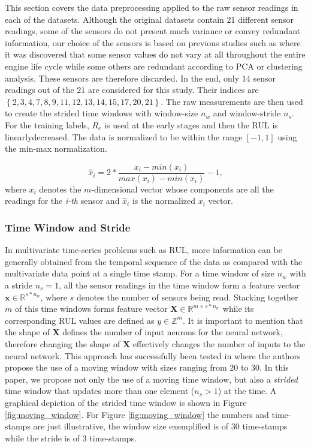 \documentclass[preprint,12pt]{elsarticle}%
\begin{document}
This section covers the data preprocessing applied to the raw sensor readings in each of the datasets. Although the original datasets contain $21$ different sensor readings, some of the sensors do not present much variance or convey redundant information, our choice of the sensors is based on previous studies such as \cite{Lim2016, Li2018} where it was discovered that some sensor values do not vary at all throughout the entire engine life cycle while some others are redundant according to PCA or clustering analysis. These sensors are therefore discarded. In the end, only $14$ sensor readings out of the $21$ are considered for this study. Their indices are $\left\lbrace 2, 3, 4, 7, 8, 9, 11, 12, 13, 14, 15, 17, 20, 21 \right\rbrace $. The raw measurements are then used to create the strided time windows with window-size $n_{w}$ and window-stride $n_{s}$. For the training labels, $R_{e}$ is used at the early stages and then the RUL is linearlydecreased. The data is normalized to be within the range $\left[  -1,1 \right]  $ using the min-max normalization.

\begin{equation}
\hat{x}_{i} = 2* \frac{x_{i} - min(x_{i})}{max(x_{i}) - min(x_{i})} - 1,
\label{eq:min_max_norm}%
\end{equation}
where $x_{i}$ denotes the $m$-dimensional vector whose components are all the
readings for the \textit{i-th} sensor and $\hat{x}_{i}$ is the normalized
$x_{i}$ vector.

\subsubsection{Time Window and Stride}

In multivariate time-series problems such as RUL, more information can be
generally obtained from the temporal sequence of the data as compared with the
multivariate data point at a single time stamp. For a time window of size
$n_{w}$ with a stride $n_{s}=1$, all the sensor readings in the time window
form a feature vector $\mathbf{x} \in \mathbb{R}^{s*n_w}$, where $s$ denotes the number of sensors being read. Stacking together $m$ of this time windows forms feature vector $\mathbf{X} \in \mathbb{R}^{m \times s*n_w}$ while its corresponding RUL values are defined as $y \in \mathbb{Z}^m$. It is important to mention that the shape of $\mathbf{X}$ defines the number of input neurons for the neural network, therefore changing the shape of $\mathbf{X}$ effectively changes the number of inputs to the neural network. This approach has successfully been tested in \cite{Li2018,Lim2016} where the authors propose the use of a moving window with sizes ranging from 20 to 30. In this paper, we propose not only the use of a moving time window, but also a \textit{strided} time window that updates more than one element ($n_s>1$) at the time. A graphical depiction of the strided time window is shown in Figure \ref{fig:moving_window}. For Figure \ref{fig:moving_window} the numbers and time-stamps are just illustrative, the window size exemplified is of 30 time-stamps while the stride is of 3 time-stamps.
\end{document}
